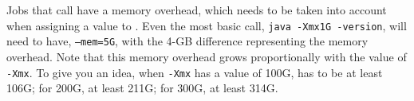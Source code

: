 
Jobs that call  have a memory overhead, which needs to be taken 
into account when assigning a value to . Even the most basic 
 call, \texttt{java -Xmx1G -version}, will need to have,
\texttt{--mem=5G}, with the 4-GB difference representing the memory overhead. 
Note that this memory overhead grows proportionally with the value of
\texttt{-Xmx}. To give you an idea, when \texttt{-Xmx} has a value of 100G,
 has to be at least 106G; for 200G, at least 211G; for 300G, at least 314G.

